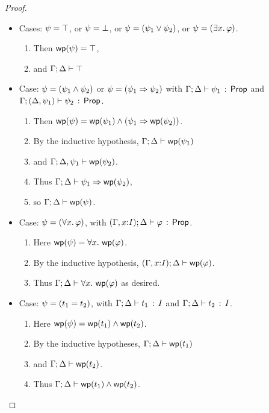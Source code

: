 \documentclass[10pt,a4paper]{article}
\begin{document}
\begin{proof}
\begin{itemize}
  \item Cases: $\psi = \top$, or $\psi = \bot$, or $\psi = (\psi_1 \vee \psi_2)$, or $\psi = (\exists x.\, \varphi)$.
      \begin{enumerate}
      \item 
      	Then $\mathop{\mathsf{wp}}(\psi) = \top$,
      \item
        and $\Gamma;\Delta \vdash \top$ 
      \end{enumerate}
            
  \item Case: $\psi = (\psi_1 \wedge \psi_2)$ or $\psi = (\psi_1 \Rightarrow \psi_2)$ with
       $\Gamma;\Delta \vdash \psi_1\, :\, \mathsf{Prop}$ and 
              $\Gamma;(\Delta,\psi_1) \vdash \psi_2\, :\, \mathsf{Prop}$.
       \begin{enumerate}
       \item Then $\mathop{\mathsf{wp}}(\psi) = \mathop{\mathsf{wp}}(\psi_1) \wedge (\psi_1 \Rightarrow \mathop{\mathsf{wp}}(\psi_2))$.
       \item By the inductive hypothesis,
         $\Gamma;\Delta \vdash \mathop{\mathsf{wp}}(\psi_1)$
       \item 
         and $\Gamma;\Delta,\psi_1 \vdash \mathop{\mathsf{wp}}(\psi_2)$.
       \item 
         Thus $\Gamma;\Delta \vdash \psi_1 \Rightarrow \mathop{\mathsf{wp}}(\psi_2)$,
       \item
         so $\Gamma;\Delta \vdash \mathop{\mathsf{wp}}(\psi)$.    
       \end{enumerate}
  \item Case: $\psi=(\forall x.\, \varphi)$, 
        with $(\Gamma,x{:}I);\Delta \vdash \varphi\, :\, \mathsf{Prop}$.
  	\begin{enumerate}
	\item 
		Here $\mathop{\mathsf{wp}}(\psi) = \forall x.\, \mathop{\mathsf{wp}}(\varphi)$.
	\item 
		By the inductive hypothesis,
	   $(\Gamma,x{:}I);\Delta \vdash \mathop{\mathsf{wp}}(\varphi)$.
	\item 
		Thus
	   $\Gamma;\Delta \vdash \forall x.\, \mathop{\mathsf{wp}}(\varphi)$ as desired.
	\end{enumerate}
  \item Case: $\psi = (t_1 = t_2)$, with $\Gamma;\Delta \vdash t_1\, :\, I$ and $\Gamma;\Delta \vdash t_2\, :\, I$. 
    	\begin{enumerate}
	\item 
		Here $\mathop{\mathsf{wp}}(\psi) = \mathop{\mathsf{wp}}(t_1) \wedge \mathop{\mathsf{wp}}(t_2)$.
	\item 
		By the inductive hypotheses,
		$\Gamma;\Delta \vdash \mathop{\mathsf{wp}}(t_1)$ 
	\item 
		and $\Gamma;\Delta \vdash \mathop{\mathsf{wp}}(t_2)$.
	\item
		Thus $\Gamma;\Delta \vdash \mathop{\mathsf{wp}}(t_1) \wedge \mathop{\mathsf{wp}}(t_2)$.
	\end{enumerate}       
  \end{itemize}
\end{proof}
\end{document}
